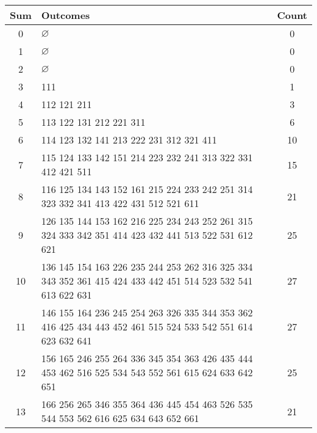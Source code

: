 \documentclass[class=math239,notes,tikz]{agony}
\begin{document}
\begin{enumerate}
\begin{sol}
\begin{center}
\begin{tabular}{c|l|c}
              Sum & Outcomes                                                                                                    & Count \\ \hline
              0   & $\varnothing$                                                                                               & 0     \\
              1   & $\varnothing$                                                                                               & 0     \\
              2   & $\varnothing$                                                                                               & 0     \\
              3   & 111                                                                                                         & 1     \\
              4   & 112 121 211                                                                                                 & 3     \\
              5   & 113 122 131 212 221 311                                                                                     & 6     \\
              6   & 114 123 132 141 213 222 231 312 321 411                                                                     & 10    \\
              7   & 115 124 133 142 151 214 223 232 241 313 322 331 412 421 511                                                 & 15    \\
              8   & 116 125 134 143 152 161 215 224 233 242 251 314 323 332 341 413 422 431 512 521 611                         & 21    \\
              9   & 126 135 144 153 162 216 225 234 243 252 261 315 324 333 342 351 414 423 432 441 513 522 531 612 621         & 25    \\
              10  & 136 145 154 163 226 235 244 253 262 316 325 334 343 352 361 415 424 433 442 451 514 523 532 541 613 622 631 & 27    \\
              11  & 146 155 164 236 245 254 263 326 335 344 353 362 416 425 434 443 452 461 515 524 533 542 551 614 623 632 641 & 27    \\
              12  & 156 165 246 255 264 336 345 354 363 426 435 444 453 462 516 525 534 543 552 561 615 624 633 642 651         & 25    \\
              13  & 166 256 265 346 355 364 436 445 454 463 526 535 544 553 562 616 625 634 643 652 661                         & 21    \\

\end{tabular}
\end{center}
\end{sol}
\end{enumerate}
\end{document}
